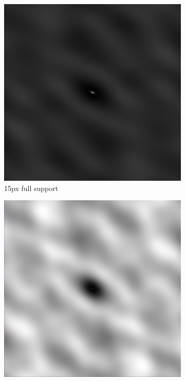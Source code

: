 \begin{figure}[ht!]
\begin{mdframed}
\begin{subfigure}[b]{0.45\textwidth}
      \includegraphics[width=\textwidth]{images/180min_single_15.png}
      \caption{15px full support}
    \end{subfigure}
    \begin{subfigure}[b]{0.45\textwidth}\centering
      \includegraphics[width=\textwidth]{images/180min_single_23.png}

\end{subfigure}
\end{mdframed}
\end{figure}
